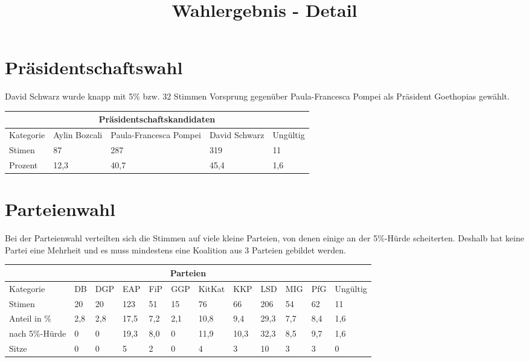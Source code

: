 \documentclass{sasbase}
\begin{document}
\onecolumn
\title{Wahlergebnis - Detail}

\mytitle

\setlength{\parindent}{0mm}
\setlength{\parskip}{2mm}
\renewcommand{\arraystretch}{1.3}

\section{Präsidentschaftswahl}

David Schwarz wurde knapp mit 5\% bzw. 32 Stimmen Vorsprung gegenüber Paula-Francesca Pompei als Präsident Goethopias gewählt.

\begin{center}
    \begin{tabular}{ |p{3cm}||p{3cm}|p{3cm}|p{3cm}|p{3cm}|  }
     \hline
     \multicolumn{5}{|c|}{Präsidentschaftskandidaten} \\
     \hline
     Kategorie & Aylin Bozcali  & Paula-Francesca Pompei & David Schwarz & Ungültig\\
     \hline
     Stimen   & 87    & 287 &   319 & 11 \\
     Prozent &  12,3  & 40,7   & 45,4 & 1,6 \\
     \hline
    \end{tabular}
\end{center}


\section{Parteienwahl}

Bei der Parteienwahl verteilten sich die Stimmen auf viele kleine Parteien, von denen
einige an der 5\%-Hürde scheiterten. Deshalb hat keine Partei eine Mehrheit und es muss
mindestens eine Koalition aus 3 Parteien gebildet werden.

\vspace{5mm}
\begin{tabular}{ |p{3cm}||p{1cm}|p{1cm}|p{1cm}|p{1cm}|p{1cm}|p{1cm}|p{1cm}|p{1cm}|p{1cm}|p{1cm}|p{1.2cm}|  }
     \hline
     \multicolumn{12}{|c|}{Parteien} \\
     \hline
     Kategorie & DB & DGP & EAP & FiP & GGP & KitKat & KKP & LSD & MIG & PfG & Ungültig\\
     \hline
     Stimen   & 20 & 20  & 123 & 51 & 15 & 76 & 66 & 206 & 54 & 62 & 11 \\
     Anteil in \%  & 2,8 & 2,8  & 17,5 & 7,2 & 2,1 & 10,8 & 9,4 & 29,3 & 7,7 & 8,4 & 1,6 \\
    nach 5\%-Hürde  & 0 & 0 & 19,3  & 8,0 & 0 & 11,9 & 10,3 & 32,3 & 8,5 & 9,7 & 1,6 \\
     \hline
      \hline
     Sitze & 0 & 0 & 5 & 2 & 0 & 4 & 3 & 10 & 3 & 3 & 0\\
     \hline
\end{tabular}
\end{document}
